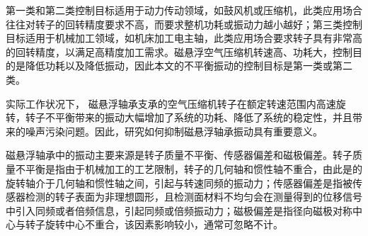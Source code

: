 \documentclass[
  lang=cn,
  degree=master,
  openany,oneside
]{nuaathesis}
\begin{document}
第一类和第二类控制目标适用于动力传动领域，如鼓风机或压缩机，此类应用场合往往对转子的回转精度要求不高，而要求整机功耗或振动力越小越好；第三类控制目标适用于机械加工领域，如机床加工电主轴，此类应用场合要求转子具有非常高的回转精度，以满足高精度加工需求。磁悬浮空气压缩机转速高、功耗大，控制目的是降低功耗以及降低振动，因此本文的不平衡振动的控制目标是第一类或第二类。

实际工作状况下， 磁悬浮轴承支承的空气压缩机转子在额定转速范围内高速旋转，转子不平衡带来的振动大幅增加了系统的功耗、降低了系统的稳定性，并且带来的噪声污染问题。因此，研究如何抑制磁悬浮轴承振动具有重要意义。

磁悬浮轴承中的振动主要来源是转子质量不平衡、传感器偏差和磁极偏差。转子质量不平衡是指由于机械加工的工艺限制，转子的几何轴和惯性轴不重合，由此是的旋转轴介于几何轴和惯性轴之间，引起与转速同频的振动力；传感器偏差是指被传感器检测的转子表面为非理想圆形，且检测面材料不均匀会在测量得到的位移信号中引入同频或者倍频信息，引起同频或倍频振动力；磁极偏差是指径向磁极对称中心与转子旋转中心不重合，该因素影响较小，通常可忽略不计。
\end{document}
